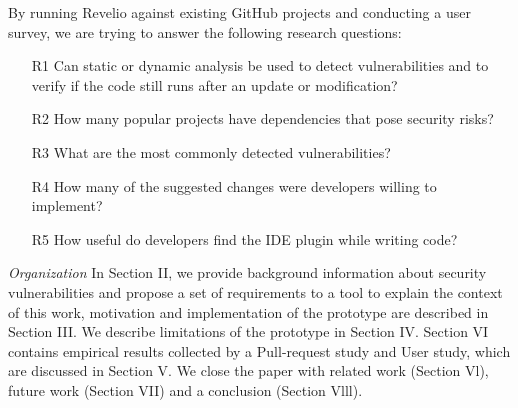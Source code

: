 By running Revelio against existing GitHub projects and conducting a user survey, we are trying to answer the following research questions:
\begin{itemize}
\item [R1] Can static or dynamic analysis be used to detect vulnerabilities and to verify if the code still runs after an update or modification?
\item [R2] How many popular projects have dependencies that pose security risks?
\item [R3] What are the most commonly detected vulnerabilities?
\item [R4] How many of the suggested changes were developers willing to implement?
\item [R5] How useful do developers find the IDE plugin while writing code?
\end{itemize}


\emph{Organization} In Section II, we provide background information about security vulnerabilities and propose a set of requirements to a tool to explain the context of this work, motivation and implementation of the prototype are described in Section III. We describe limitations of the prototype in Section IV. Section VI contains empirical results collected by a Pull-request study and User study, which are discussed in Section V. We close the paper with related work (Section Vl), future work (Section VII) and a conclusion (Section Vlll).
